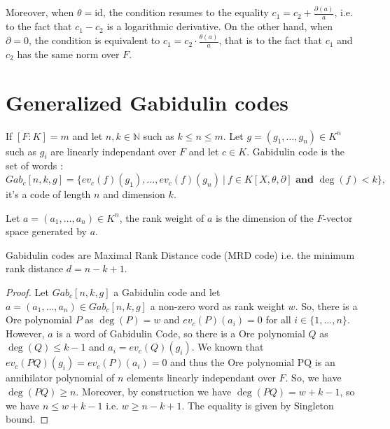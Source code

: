 \documentclass[a4paper]{llncs}
\newcommand{\id}{\textrm{id}}
\begin{document}
Moreover, when $\theta = \id$, the condition resumes to the equality 
$c_1 = c_2 + \frac{\partial(a)} a$, i.e. to the fact that $c_1 - c_2$ is 
a logarithmic derivative. On the other hand, when $\partial = 0$, the 
condition is equivalent to $c_1 = c_2 \cdot \frac{\theta(a)}a$, that is 
to the fact that $c_1$ and $c_2$ has the same norm over $F$.



\section{Generalized Gabidulin codes}

\begin{definition}
If $[F:K] = m$ and let $n, k \in \mathbb{N}$ such as $k \leqslant n \leqslant m$. Let $g=(g_1, \dots, g_n) \in K^n$ such as $g_i$ are linearly independant over $F$ and let $c \in K$. Gabidulin code is the set of words : 
$$Gab_c[n,k,g] =\{ ev_c(f)(g_1), \dots, ev_c(f)(g_n)\ | \ f \in K[X, \theta, \partial] \textbf{ and } \deg(f)<k\},$$
it's a code of length $n$ and dimension $k$.
\end{definition}

\begin{definition}
Let $a = (a_1, \dots, a_n) \in K^n$, the rank weight of $a$ is the dimension of the $F$-vector space generated by $a$.
\end{definition}

\begin{proposition}
Gabidulin codes are Maximal Rank Distance code (MRD code) i.e. the minimum rank distance $d = n-k+1$.
\end{proposition}

\begin{proof}
Let $Gab_c[n,k,g]$ a Gabidulin code and let $a = (a_1, \dots, a_n) \in Gab_c[n,k,g]$ a non-zero word as rank weight $w$. So, there is a Ore polynomial $P$ as $\deg(P) = w$ and $ev_c(P)(a_i) = 0$ for all $i \in \{1, \dots, n\}$. However, $a$ is a word of Gabidulin Code, so there is a Ore polynomial $Q$ as $\deg(Q) \leqslant k-1$ and $a_i = ev_c(Q)(g_i)$. We known that $ev_c(PQ)(g_i) = ev_c(P)(a_i) = 0$ and thus the Ore polynomial PQ is an annihilator polynomial of $n$ elements linearly independant over $F$. So, we have $\deg(PQ) \geqslant n$. Moreover, by construction we have $\deg(PQ) = w + k -1$, so we have $n \leqslant w+k-1$ i.e. $w \geqslant n-k+1$. The equality is given by Singleton bound.
\end{proof}
\end{document}
